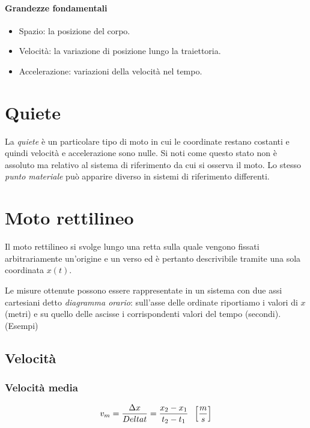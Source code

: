 \documentclass[class=book, crop=false, oneside, 12pt]{standalone}
\begin{document}
      \paragraph{Grandezze fondamentali}
      \begin{itemize}
        \item Spazio: la posizione del corpo.
        \item Velocit\`a: la variazione di posizione lungo la traiettoria.
        \item Accelerazione: variazioni della velocità nel tempo.
      \end{itemize}
\section{Quiete}
La \emph{quiete} è un particolare tipo di moto in cui le coordinate restano costanti e quindi velocità e accelerazione sono nulle.
Si noti come questo stato non \`e assoluto ma relativo al sistema di riferimento da cui si osserva il moto.
Lo stesso \emph{punto materiale} può apparire diverso in sistemi di riferimento differenti.
\section{Moto rettilineo}
Il moto rettilineo si svolge lungo una retta sulla quale vengono fissati arbitrariamente un'origine e un verso ed è pertanto descrivibile tramite una sola coordinata \(x(t)\).

Le misure ottenute possono essere rappresentate in un sistema con due assi cartesiani detto \emph{diagramma orario}: sull'asse delle ordinate riportiamo i valori di \(x\) (metri) e su quello delle ascisse i corrispondenti valori del tempo (secondi).
(Esempi)
  \subsection{Velocità}
    \subsubsection{Velocit\`a media}
    \begin{equation*}
      v_m = \dfrac {\Delta x} {Delta t} = \dfrac {x_2 - x_1} {t_2 - t_1} \hspace{0.2cm} \left[\dfrac {m} {s}\right]
    \end{equation*}
\end{document}
